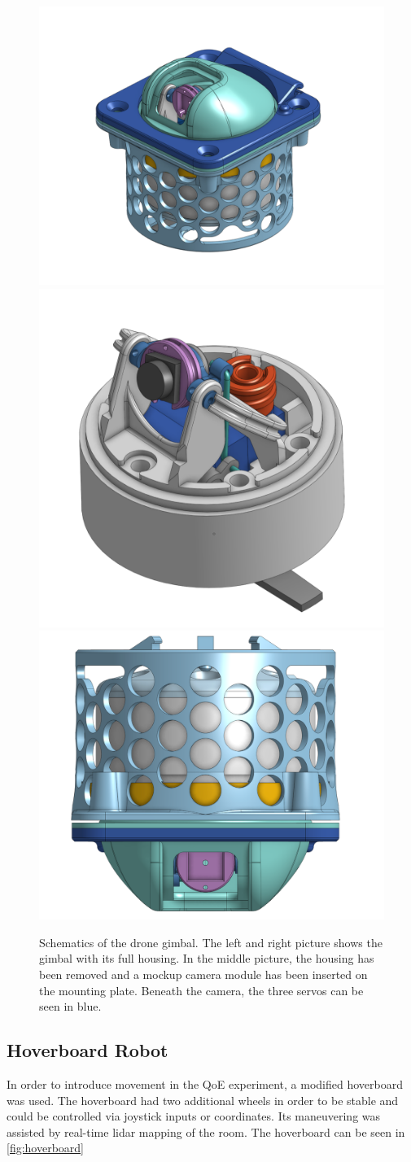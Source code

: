 \documentclass[nofilelist]{cslthse-msc}
\begin{document}
\begin{description}
   \begin{figure}[htp]
      \centering
      \includegraphics[width=.3\textwidth]{images/gimbal-1.png}\hfill
      \includegraphics[width=.35\textwidth]{images/gimbal-3.png}\hfill
      \includegraphics[width=.25\textwidth]{images/gimbal-2.png}
      \caption{Schematics of the drone gimbal. The left and right picture shows the gimbal with its full housing. In the middle picture, the housing has been removed and a mockup camera module has been inserted on the mounting plate. Beneath the camera, the three servos can be seen in blue.}
      \label{fig:gimbal-pics}
   \end{figure}
\end{description}
   
\subsection{Hoverboard Robot}
In order to introduce movement in the QoE experiment, a modified hoverboard was used. The hoverboard had two additional wheels in order to be stable and could be controlled via joystick inputs or coordinates. Its maneuvering was assisted by real-time lidar mapping of the room. The hoverboard can be seen in \ref{fig:hoverboard}
\end{document}
